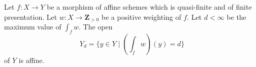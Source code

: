 %
\begin{lemma}
\label{lemma-affineness-of-large-open}
Let $f : X \to Y$ be a morphism of affine schemes which is
quasi-finite and of finite presentation.
Let $w : X \to \mathbf{Z}_{> 0}$ be a positive weighting of $f$.
Let $d < \infty$ be the maximum value of $\int_f w$. The open
$$
Y_d = \{y \in Y \mid (\textstyle{\int}_f w)(y) = d \}
$$
of $Y$ is affine.
\end{lemma}

